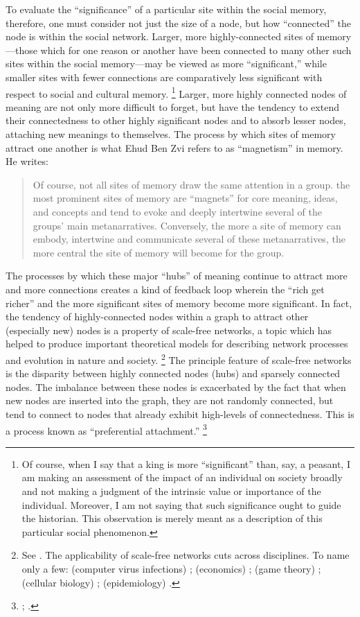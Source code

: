 To evaluate the ``significance'' of a particular site within the social memory, therefore, one must consider not just the size of a node, but how ``connected'' the node is within the social network. Larger, more highly-connected sites of memory---those which for one reason or another have been connected to many other such sites within the social memory---may be viewed as more ``significant,'' while smaller sites with fewer connections are comparatively less significant with respect to social and cultural memory.%
    \footnote{Of course, when I say that a king is more ``significant'' than, say, a peasant, I am making an assessment of the impact of an individual on society broadly and not making a judgment of the intrinsic value or importance of the individual. Moreover, I am not saying that such significance ought to guide the historian. This observation is merely meant as a description of this particular social phenomenon.}
Larger, more highly connected nodes of meaning are not only more difficult to forget, but have the tendency to extend their connectedness to other highly significant nodes and to absorb lesser nodes, attaching new meanings to themselves. The process by which sites of memory attract one another is what Ehud Ben Zvi refers to as ``magnetism'' in memory. He writes:
\begin{quote}
    Of course, not all sites of memory draw the same attention in a group. the most prominent sites of memory are ``magnets'' for core meaning, ideas, and concepts and tend to evoke and deeply intertwine several of the groups' main metanarratives. Conversely, the more a site of memory can embody, intertwine and communicate several of these metanarratives, the more central the site of memory will become for the group.\autocite[73]{benzvi_st2017}
\end{quote}
\noindent
The processes by which these major ``hubs'' of meaning continue to attract more and more connections creates a kind of feedback loop wherein the ``rich get richer'' and the more significant sites of memory become more significant. In fact, the tendency of highly-connected nodes within a graph to attract other (especially new) nodes is a property of scale-free networks, a topic which has helped to produce important theoretical models for describing network processes and evolution in nature and society.%
    \footnote{See \cite[30--33]{caldarelli2007}. The applicability of scale-free networks cuts across disciplines. To name only a few: 
        (computer virus infections) \cite{satorras-alessandro_prl2001};
        (economics) \cite{garlaschelli-etal_pysisca-a2005};
        (game theory) \cite{santos-pacheo_prl2005};
        (cellular biology) \cite{albert_jcs2005};
        (epidemiology) \cite{may-lloyd_pre2001}.}
The principle feature of scale-free networks is the disparity between highly connected nodes (hubs) and sparsely connected nodes. The imbalance between these nodes is exacerbated by the fact that when new nodes are inserted into the graph, they are not randomly connected, but tend to connect to nodes that already exhibit high-levels of connectedness. This is a process known as ``preferential attachment.''%
    \footnote{%
        \cite{barabasi-albert_science1999};
        \cite{jeong-etal_epl2003}.}

